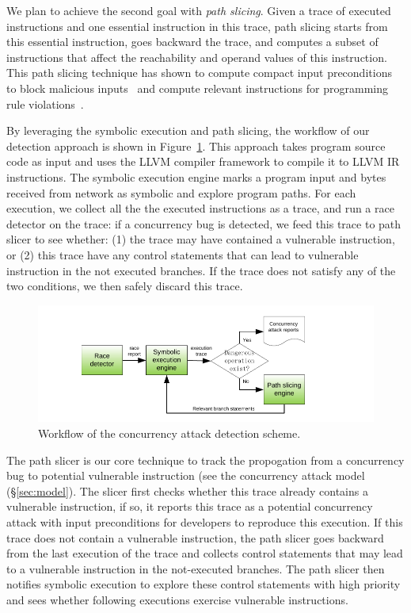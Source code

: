 We plan to achieve the second goal with \emph{path slicing}. Given a 
trace of executed instructions and one essential instruction in this trace, 
path slicing starts from this essential instruction, goes backward the trace, 
and computes a subset of instructions that affect the reachability and operand 
values of this instruction. This path slicing technique has shown to compute 
compact input preconditions to block malicious inputs~\cite{castro:bouncer} and 
compute relevant instructions for programming rule 
violations~\cite{woodpecker:asplos13}.

By leveraging the symbolic execution and path slicing, the workflow of our 
detection approach is shown in Figure~\ref{fig:detection}. This approach takes 
program source code as input and uses the LLVM compiler framework to compile it 
to LLVM IR instructions. The symbolic execution engine marks a program input 
and bytes received from network as symbolic and explore program paths. For each 
execution, we collect all the the executed instructions as a trace, and run a 
race detector on the trace: if a concurrency bug is detected, we feed this 
trace to path slicer to see whether: (1) the trace may have contained a 
vulnerable instruction, or (2) this trace have any control statements that can 
lead to vulnerable instruction in the not executed branches. If the trace does 
not satisfy any of the two conditions, we then safely discard this trace.

\begin{figure}[ht]
\centering
\includegraphics[width=0.5\columnwidth]{figures/detection}
\vspace{-.05in}
\caption{{Workflow of the concurrency attack detection scheme.}} 
\label{fig:detection}
\vspace{-.05in}
\end{figure}



The path slicer is our core technique to track the propogation from a 
concurrency bug to potential vulnerable instruction (see the concurrency attack 
model (\S\ref{sec:model}). The slicer first checks whether this trace already 
contains a vulnerable instruction, if so, it reports this trace as a potential 
concurrency attack with input preconditions for developers to reproduce this 
execution. If this trace does not contain a vulnerable instruction, the 
path slicer goes backward from the last execution of the trace and
collects control statements that may lead to a vulnerable instruction in the 
not-executed branches. The path slicer then notifies symbolic execution 
to explore these control statements with high priority and sees whether 
following executions exercise vulnerable instructions.

